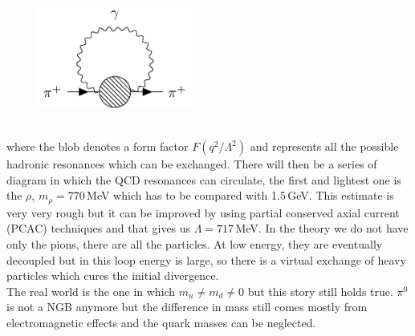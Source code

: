 \documentclass[../main.tex]{subfiles}
\begin{document}
\begin{figure}[h]
    \centering
    \includegraphics[width=0.45\textwidth]{Images/blob.pdf}
    \caption*{}
\end{figure}\\
where the blob denotes a form factor $F(q^2/\Lambda^2)$ and represents all the possible hadronic resonances which can be exchanged. There will then be a series of diagram in which the QCD resonances can circulate, the first and lightest one is the $\rho$, $m_\rho=770$\,MeV which has to be compared with 1.5\,GeV. This estimate is very very rough but it can be improved by using partial conserved axial current (PCAC) techniques and that gives us $\Lambda=717$\,MeV. In the theory we do not have only the pions, there are all the particles. At low energy, they are eventually decoupled but in this loop energy is large, so there is a virtual exchange of heavy particles which cures the initial divergence.\\ 
The real world is the one in which $m_u\neq m_d\neq0$ but this story still holds true. $\pi^0$ is not a NGB anymore but the difference in mass still comes mostly from electromagnetic effects and the quark masses can be neglected.
\end{document}
